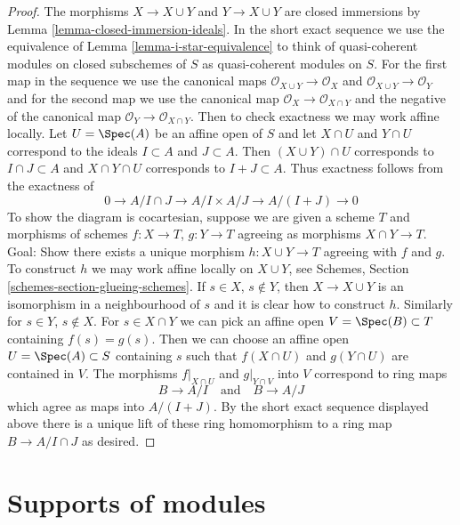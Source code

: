 \begin{proof}
The morphisms $X \to X \cup Y$ and $Y \to X \cup Y$ are closed immersions
by Lemma \ref{lemma-closed-immersion-ideals}. In the short exact sequence
we use the equivalence of Lemma \ref{lemma-i-star-equivalence} to think of
quasi-coherent modules on closed subschemes of $S$ as quasi-coherent modules
on $S$. For the first map in the sequence we use the canonical maps
$\mathcal{O}_{X \cup Y} \to \mathcal{O}_X$ and
$\mathcal{O}_{X \cup Y} \to \mathcal{O}_Y$
and for the second map we use the canonical map
$\mathcal{O}_X \to \mathcal{O}_{X \cap Y}$ and
the negative of the canonical map
$\mathcal{O}_Y \to \mathcal{O}_{X \cap Y}$. Then to check
exactness we may work affine locally.
Let $U = \Spec(A)$ be an affine open of $S$ and let $X \cap U$ and $Y \cap U$
correspond to the ideals $I \subset A$ and $J \subset A$. Then
$(X \cup Y) \cap U$ corresponds to $I \cap J \subset A$
and $X \cap Y \cap U$ corresponds to $I + J \subset A$.
Thus exactness follows from the exactness of
$$
0 \to A/I \cap J \to A/I \times A/J \to A/(I + J) \to 0
$$
To show the diagram is cocartesian, suppose we are given a scheme $T$
and morphisms of schemes $f : X \to T$, $g : Y \to T$ agreeing
as morphisms $X \cap Y \to T$. Goal: Show there exists a unique
morphism $h : X \cup Y \to T$ agreeing with $f$ and $g$.
To construct $h$ we may work affine locally on $X \cup Y$, see
Schemes, Section \ref{schemes-section-glueing-schemes}.
If $s \in X$, $s \not \in Y$, then $X \to X \cup Y$ is
an isomorphism in a neighbourhood of $s$ and it is clear
how to construct $h$. Similarly for $s \in Y$, $s \not \in X$.
For $s \in X \cap Y$ we can pick an affine open
$V = \Spec(B) \subset T$ containing $f(s) = g(s)$.
Then we can choose an affine open $U = \Spec(A) \subset S$
containing $s$ such that $f(X \cap U)$ and $g(Y \cap U)$
are contained in $V$. The morphisms $f|_{X \cap U}$
and $g|_{Y \cap V}$ into $V$ correspond to ring maps
$$
B \to A/I
\quad\text{and}\quad
B \to A/J
$$
which agree as maps into $A/(I + J)$. By the short exact sequence
displayed above there is a unique lift of these ring homomorphism
to a ring map $B \to A/I \cap J$ as desired.
\end{proof}









\section{Supports of modules}
\label{section-support}

